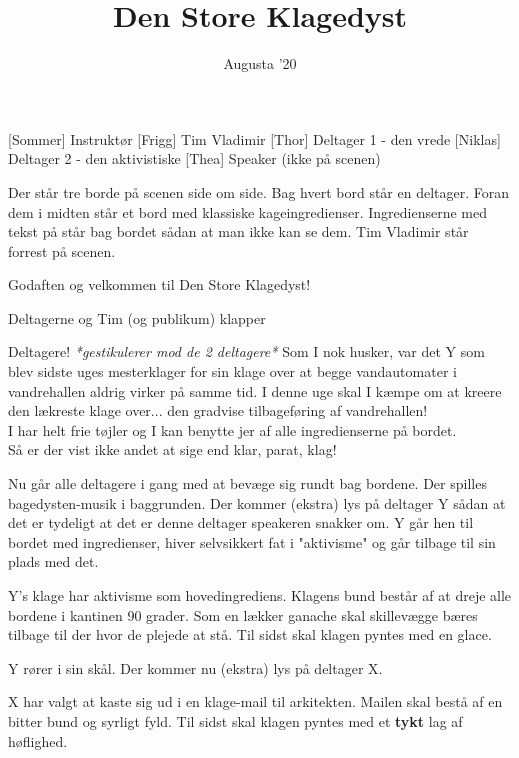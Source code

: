 \documentclass[a4paper,11pt]{article}
\title{Den Store Klagedyst}
\author{Augusta '20}
\begin{document}
\maketitle

\begin{roles}
[Sommer] Instruktør
[Frigg] Tim Vladimir
[Thor] Deltager 1 - den vrede
[Niklas] Deltager 2 - den aktivistiske
[Thea] Speaker (ikke på scenen)
\end{roles}

\begin{sketch}
\scene Der står tre borde på scenen side om side. Bag hvert bord står en deltager. Foran dem i midten står et bord med klassiske kageingredienser. Ingredienserne med tekst på står bag bordet sådan at man ikke kan se dem. Tim Vladimir står forrest på scenen.

 Godaften og velkommen til Den Store Klagedyst!

\scene Deltagerne og Tim (og publikum) klapper

 Deltagere! \textit{*gestikulerer mod de 2 deltagere*} Som I nok husker, var det Y som blev sidste uges mesterklager for sin klage over at begge vandautomater i vandrehallen aldrig virker på samme tid. I denne uge skal I kæmpe om at kreere den lækreste klage over... den gradvise tilbageføring af vandrehallen! \\
I har helt frie tøjler og I kan benytte jer af alle ingredienserne på bordet. \\
Så er der vist ikke andet at sige end klar, parat, klag!  

\scene Nu går alle deltagere i gang med at bevæge sig rundt bag bordene. Der spilles bagedysten-musik i baggrunden. Der kommer (ekstra) lys på deltager Y sådan at det er tydeligt at det er denne deltager speakeren snakker om. Y går hen til bordet med ingredienser, hiver selvsikkert fat i "aktivisme" og går tilbage til sin plads med det. 

 Y's klage har aktivisme som hovedingrediens. Klagens bund består af at dreje alle bordene i kantinen 90 grader. Som en lækker ganache skal skillevægge bæres tilbage til der hvor de plejede at stå. Til sidst skal klagen pyntes med en glace.   

\scene Y rører i sin skål. Der kommer nu (ekstra) lys på deltager X. 

 X har valgt at kaste sig ud i en klage-mail til arkitekten. Mailen skal bestå af en bitter bund og syrligt fyld. Til sidst skal klagen pyntes med et \textbf{tykt} lag af høflighed.


\end{sketch}
\end{document}
